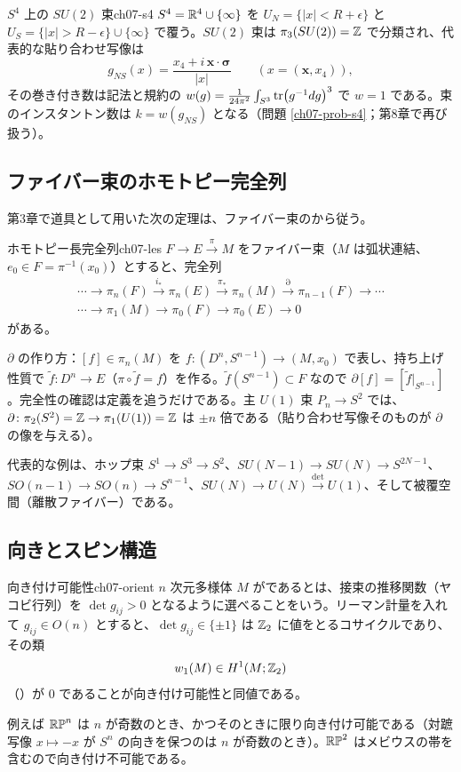 \begin{myex}{$S^4$ 上の $SU(2)$ 束}{ch07-s4}
$S^4=\mathbb{R}^4\cup\{\infty\}$ を $U_N=\{\lvert x\rvert<R+\epsilon\}$ と $U_S=\{\lvert x\rvert>R-\epsilon\}\cup\{\infty\}$ で覆う。$SU(2)$ 束は $\pi_3(SU(2))=\mathbb{Z}$ で分類され、代表的な貼り合わせ写像は
\[
g_{NS}(x)=\frac{x_4+i\,\bm x\cdot\bm\sigma}{\lvert x\rvert}\qquad(x=(\bm x,x_4)),
\]
その巻き付き数は記法と規約の $w(g)=\frac{1}{24\pi^2}\int_{S^3}\tr(g^{-1}dg)^3$ で $w=1$ である。束のインスタントン数は $k=w(g_{NS})$ となる（問題 \ref{ch07-prob-s4}；第8章で再び扱う）。
\end{myex}

\subsection{ファイバー束のホモトピー完全列}
第3章で道具として用いた次の定理は、ファイバー束のから従う。

\begin{mythm}{ホモトピー長完全列}{ch07-les}
$F\to E\xrightarrow{\pi}M$ をファイバー束（$M$ は弧状連結、$e_0\in F=\pi^{-1}(x_0)$）とすると、完全列
\[
\begin{gathered}\cdots\to\pi_n(F)\xrightarrow{i_*}\pi_n(E)\xrightarrow{\pi_*}\pi_n(M)\xrightarrow{\partial}\pi_{n-1}(F)\to\cdots\\ \cdots\to\pi_1(M)\to\pi_0(F)\to\pi_0(E)\to0\end{gathered}
\]
がある。
\end{mythm}
\begin{note}
$\partial$ の作り方：$[f]\in\pi_n(M)$ を $f\colon(D^n,S^{n-1})\to(M,x_0)$ で表し、持ち上げ性質で $\tilde f\colon D^n\to E$（$\pi\circ\tilde f=f$）を作る。$\tilde f(S^{n-1})\subset F$ なので $\partial[f]=[\tilde f|_{S^{n-1}}]$。完全性の確認は定義を追うだけである。主 $U(1)$ 束 $P_n\to S^2$ では、$\partial\colon\pi_2(S^2)=\mathbb{Z}\to\pi_1(U(1))=\mathbb{Z}$ は $\pm n$ 倍である（貼り合わせ写像そのものが $\partial$ の像を与える）。
\end{note}

代表的な例は、ホップ束 $S^1\to S^3\to S^2$、$SU(N-1)\to SU(N)\to S^{2N-1}$、$SO(n-1)\to SO(n)\to S^{n-1}$、$SU(N)\to U(N)\xrightarrow{\det}U(1)$、そして被覆空間（離散ファイバー）である。

\subsection{向きとスピン構造}

\begin{mydef}{向き付け可能性}{ch07-orient}
$n$ 次元多様体 $M$ がであるとは、接束の推移関数（ヤコビ行列）を $\det g_{ij}>0$ となるように選べることをいう。リーマン計量を入れて $g_{ij}\in O(n)$ とすると、$\det g_{ij}\in\{\pm1\}$ は $\mathbb{Z}_2$ に値をとるコサイクルであり、その類
\[
w_1(M)\in H^1(M;\mathbb{Z}_2)
\]
（）が $0$ であることが向き付け可能性と同値である。
\end{mydef}
例えば $\mathbb{RP}^n$ は $n$ が奇数のとき、かつそのときに限り向き付け可能である（対蹠写像 $x\mapsto-x$ が $S^n$ の向きを保つのは $n$ が奇数のとき）。$\mathbb{RP}^2$ はメビウスの帯を含むので向き付け不可能である。

